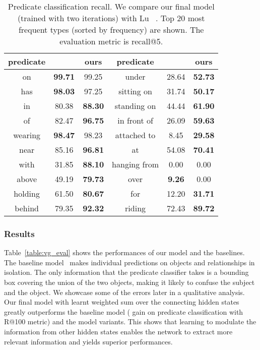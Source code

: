 \documentclass[10pt,twocolumn,letterpaper]{article}
\begin{document}
\begin{table}[!htp]
\small
  \caption{Predicate classification recall. We compare our final model (trained with two iterations) with Lu \etal~\cite{lu2016visual}. Top 20 most frequent types (sorted by frequency) are shown. The evaluation metric is recall@5.}
\begin{center}
  \begin{tabular}{c  c  c  c  c  c}
     predicate & ~\cite{lu2016visual} & ours & predicate & ~\cite{lu2016visual} & ours\\
     \hline\hline
on & \textbf{99.71} & 99.25 &under & 28.64 & \textbf{52.73} \\ 
has & \textbf{98.03} & 97.25 &sitting on & 31.74 & \textbf{50.17} \\ 
in & 80.38 & \textbf{88.30} &standing on & 44.44 & \textbf{61.90} \\ 
of & 82.47 & \textbf{96.75} &in front of & 26.09 & \textbf{59.63} \\ 
wearing & \textbf{98.47} & 98.23 &attached to & 8.45 & \textbf{29.58} \\ 
near & 85.16 & \textbf{96.81} &at & 54.08 & \textbf{70.41} \\ 
with & 31.85 & \textbf{88.10} &hanging from & 0.00 & 0.00 \\ 
above & 49.19 & \textbf{79.73} &over & \textbf{9.26} & 0.00 \\ 
holding & 61.50 & \textbf{80.67} &for & 12.20 & \textbf{31.71} \\ 
behind & 79.35 & \textbf{92.32} &riding & 72.43 & \textbf{89.72} \\ 
    \hline
  \end{tabular}
 \vspace*{-18pt}

\end{center}
\label{table:pred_type}
\end{table}



\subsubsection{Results} Table~\ref{table:vg_eval} shows the performances of our model and the baselines. The baseline model~\cite{lu2016visual} makes individual predictions on objects and relationships in isolation. The only information that
the predicate classifier takes is a bounding box covering the union of the two objects, making it likely to confuse the subject and the object. We showcase some of the errors later in a qualitative analysis.
Our final model with learnt weighted sum over the connecting hidden states greatly outperforms the baseline model ( gain on predicate classification with R@100 metric) and the model variants. 
This shows that learning to modulate the information from other hidden states enables the network to extract more relevant information and yields superior performances.
\end{document}
